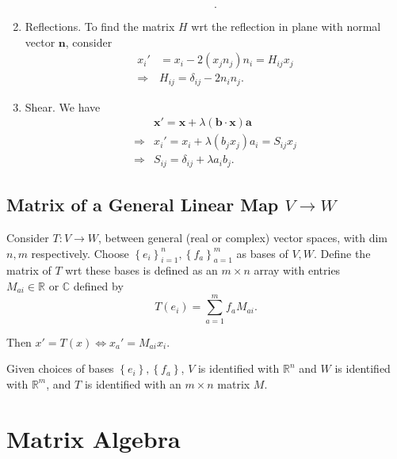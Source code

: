 \documentclass[10pt]{article}
\begin{document}
\begin{example}
\begin{enumerate}[(1)]
\[            .\]
            \item Reflections. To find the matrix $H$ wrt the reflection in plane with normal vector $ \mathbf{n} $, consider 
            \[
                \begin{aligned}
                     x_i'&=x_i-2(x_jn_j)n_i=H_{ij}x_j\\
                     \Longrightarrow & H_{ij}=\delta_{ij}-2n_in_j.
                \end{aligned}
            \]
            \item Shear. We have 
            \[
                \begin{aligned}
                     &\mathbf{x}'=\mathbf{x}+\lambda(\mathbf{b}\cdot \mathbf{x})\mathbf{a}\\
                    \Longrightarrow & x_i'=x_i+\lambda(b_jx_j)a_i=S_{ij}x_j\\
                    \Longrightarrow & S_{ij}=\delta_{ij}+\lambda a_i b_j.
                \end{aligned}
            \]
        \end{enumerate}
    \end{example}
    \subsection{Matrix of a General Linear Map $ V\to W $}
    \begin{definition}
        Consider $ T:V\to W $, between general (real or complex) vector spaces, with dim $n,m$ respectively. Choose $ \left\{ e_i\right\}_{i=1}^n, \left\{ f_a\right\}_{a=1}^m $ as bases of $ V,W $. Define the matrix of $T$ wrt these bases is defined as an $m\times n$ array with entries $ M_{ai}\in \mathbb{R}\text{ or }\mathbb{C}  $ defined by 
        \[
            T(e_i)=\sum_{a=1}^{m}f_a M_{ai}
        .\]
    \end{definition}
    Then $ x'=T(x) \Leftrightarrow x_a'=M_{ai}x_i $.
    \begin{remark}
        Given choices of bases $ \left\{ e_i\right\},\left\{ f_a\right\} $, $V$ is identified with $ \mathbb{R}^{n} $ and $W$ is identified with $ \mathbb{R}^{m} $, and $T$ is identified with an $m \times n$ matrix $M$. 
    \end{remark}
    \section{Matrix Algebra}
\end{document}
